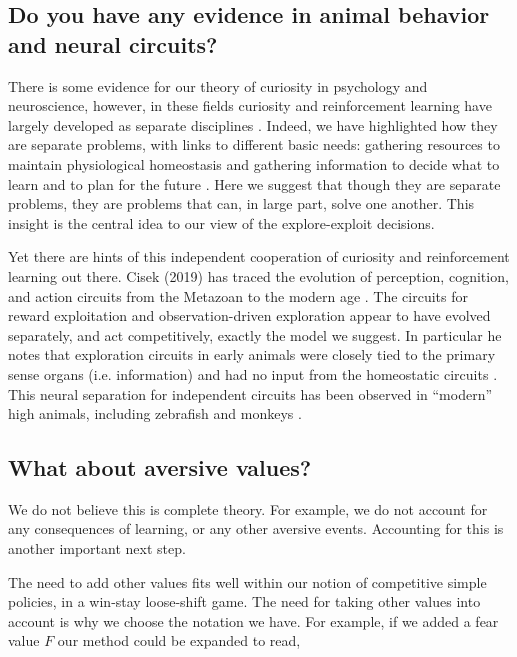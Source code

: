 \subsection*{Do you have any evidence in animal behavior and neural circuits?}
There is some evidence for our theory of curiosity in psychology and neuroscience, however, in these fields curiosity and reinforcement learning have largely developed as separate disciplines \citep{Berlyne1950,Kidd2015,Sutton2018}. Indeed, we have highlighted how they are separate problems, with links to different basic needs: gathering resources to maintain physiological homeostasis \citep{Keramati2014,Juechems2019} and gathering information to decide what to learn and to plan for the future \citep{Valiant1984,Sutton2018}. Here we suggest that though they are separate problems, they are problems that can, in large part, solve one another. This insight is the central idea to our view of the explore-exploit decisions. 

Yet there are hints of this independent cooperation of curiosity and reinforcement learning out there. Cisek (2019) has traced the evolution of perception, cognition, and action circuits from the Metazoan to the modern age \citep{Cisek2019}. The circuits for reward exploitation and observation-driven exploration appear to have evolved separately, and act competitively, exactly the model we suggest. In particular he notes that exploration circuits in early animals were closely tied to the primary sense organs (i.e. information) and had no input from the homeostatic circuits \citep{Keramati2014,Cisek2019,Juechems2019}. This neural separation for independent circuits has been observed in ``modern'' high animals, including zebrafish \citep{Marques2019} and monkeys \citep{White2019,Wang2019}. 


\subsection*{What about aversive values?}
We do not believe this is complete theory. For example, we do not account for any consequences of learning, or any other aversive events. Accounting for this is another important next step.

The need to add other values fits well within our notion of competitive simple policies, in a win-stay loose-shift game. The need for taking other values into account is why we choose the notation we have. For example, if we added a fear value $F$ our method could be expanded to read,

